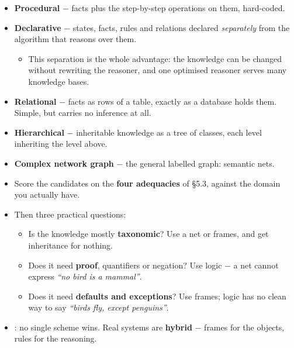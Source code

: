 {\begin{itemize}
  \item \textbf{Procedural} $-$ facts plus the step-by-step operations on them,
        hard-coded.
  \item \textbf{Declarative} $-$ states, facts, rules and relations declared
        \emph{separately} from the algorithm that reasons over them.
  \begin{itemize}
    \item This separation is the whole advantage: the knowledge can be changed without
          rewriting the reasoner, and one optimised reasoner serves many knowledge bases.
  \end{itemize}
  \item \textbf{Relational} $-$ facts as rows of a table, exactly as a database holds
        them. Simple, but carries no inference at all.
  \item \textbf{Hierarchical} $-$ inheritable knowledge as a tree of classes,
        each level inheriting the level above.
  \item \textbf{Complex network graph} $-$ the general labelled graph: semantic nets.
\end{itemize}}

\vspace{3pt}
\begin{itemize}
  \item Score the candidates on the \textbf{four adequacies} of \S5.3, against the domain
        you actually have.
  \item Then three practical questions:
  \begin{itemize}
    \item Is the knowledge mostly \textbf{taxonomic}? Use a net or frames, and get
          inheritance for nothing.
    \item Does it need \textbf{proof}, quantifiers or negation? Use logic $-$ a net
          cannot express \emph{``no bird is a mammal''}.
    \item Does it need \textbf{defaults and exceptions}? Use frames; logic has no clean
          way to say \emph{``birds fly, except penguins''}.
  \end{itemize}
  \item {}: no single scheme wins.
        Real systems are \textbf{hybrid} $-$ frames for the objects, rules for the
        reasoning.
\end{itemize}


